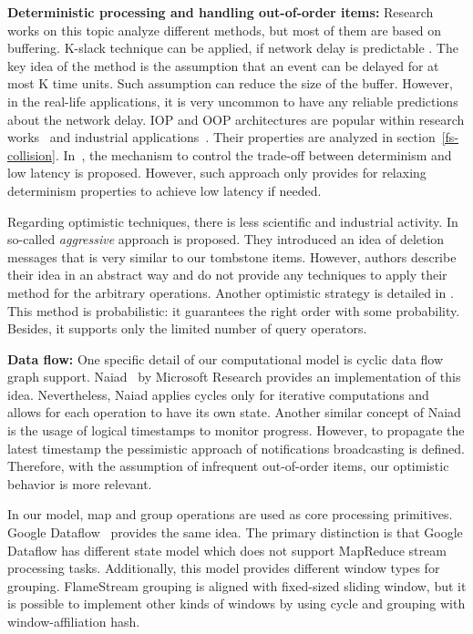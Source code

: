 
\label {fs-related-section}

{\bf Deterministic processing and handling out-of-order items:}
Research works on this topic analyze different methods, but most of them are based on buffering. K-slack technique can be applied, if network delay is predictable \cite{Babu:2004:EKC:1016028.1016032}. The key idea of the method is the assumption that an event can be delayed for at most K time units. Such assumption can reduce the size of the buffer. However, in the real-life applications, it is very uncommon to have any reliable predictions about the network delay. IOP and OOP architectures are popular within research works~\cite{Cranor:2003:GSD:872757.872838, Arasu:2006:CCQ:1146461.1146463, Li:2008:OPN:1453856.1453890} and industrial applications~\cite{carbone2015apache, Akidau:2013:MFS:2536222.2536229}. Their properties are analyzed in section~\ref{fs-collision}. In~\cite{Zacheilas:2017:MDS:3093742.3093921}, the mechanism to control the trade-off between determinism and low latency is proposed. However, such approach only provides for relaxing determinism properties to achieve low latency if needed.

Regarding optimistic techniques, there is less scientific and industrial activity. In \cite{Wei:2009:SSO:1559845.1559973} so-called {\it aggressive} approach is proposed. They introduced an idea of deletion messages that is very similar to our tombstone items. However, authors describe their idea in an abstract way and do not provide any techniques to apply their method for the arbitrary operations. Another optimistic strategy is detailed in \cite{Li2011}. This method is probabilistic: it guarantees the right order with some probability. Besides, it supports only the limited number of query operators.

{\bf Data flow:}
One specific detail of our computational model is cyclic data flow graph support. Naiad~\cite{Murray:2013:NTD:2517349.2522738} by Microsoft Research provides an implementation of this idea. Nevertheless, Naiad applies cycles only for iterative computations and allows for each operation to have its own state. Another similar concept of Naiad is the usage of logical timestamps to monitor progress. However, to propagate the latest timestamp the pessimistic approach of notifications broadcasting is defined. Therefore, with the assumption of infrequent out-of-order items, our optimistic behavior is more relevant.

In our model, map and group operations are used as core processing primitives. Google Dataflow~\cite{Akidau:2015:DMP:2824032.2824076} provides the same idea. The primary distinction is that Google Dataflow has different state model which does not support MapReduce stream processing tasks. Additionally, this model provides different window types for grouping. FlameStream grouping is aligned with fixed-sized sliding window, but it is possible to implement other kinds of windows by using cycle and grouping with window-affiliation hash.
